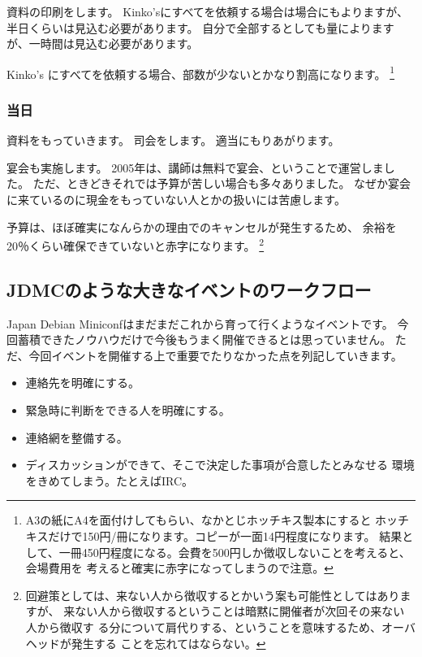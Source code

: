 \documentclass[mingoth,a4paper]{jsarticle}
\begin{document}
資料の印刷をします。
Kinko'sにすべてを依頼する場合は場合にもよりますが、半日くらいは見込む必要があります。
自分で全部するとしても量によりますが、一時間は見込む必要があります。

Kinko's にすべてを依頼する場合、部数が少ないとかなり割高になります。
\footnote{A3の紙にA4を面付けしてもらい、なかとじホッチキス製本にすると
ホッチキスだけで150円/冊になります。コピーが一面14円程度になります。
結果として、一冊450円程度になる。会費を500円しか徴収しないことを考えると、会場費用を
考えると確実に赤字になってしまうので注意。}

\subsubsection{当日}

資料をもっていきます。
司会をします。
適当にもりあがります。

宴会も実施します。
2005年は、講師は無料で宴会、ということで運営しました。
ただ、ときどきそれでは予算が苦しい場合も多々ありました。
なぜか宴会に来ているのに現金をもっていない人とかの扱いには苦慮します。

予算は、ほぼ確実になんらかの理由でのキャンセルが発生するため、
余裕を20％くらい確保できていないと赤字になります。
\footnote{
回避策としては、来ない人から徴収するとかいう案も可能性としてはありますが、
来ない人から徴収するということは暗黙に開催者が次回その来ない人から徴収す
る分について肩代りする、ということを意味するため、オーバヘッドが発生する
ことを忘れてはならない。
}


\subsection{JDMCのような大きなイベントのワークフロー}

Japan Debian Miniconfはまだまだこれから育って行くようなイベントです。
今回蓄積できたノウハウだけで今後もうまく開催できるとは思っていません。
ただ、今回イベントを開催する上で重要でたりなかった点を列記していきます。

\begin{itemize}
 \item 連絡先を明確にする。
 \item 緊急時に判断をできる人を明確にする。
 \item 連絡網を整備する。
 \item ディスカッションができて、そこで決定した事項が合意したとみなせる
       環境をきめてしまう。たとえばIRC。
\end{itemize}
\end{document}
